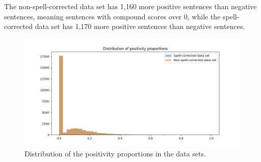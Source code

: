 The non-spell-corrected data set has 1,160 more positive sentences than negative sentences, meaning sentences with compound scores over 0, while the spell-corrected data set has 1,170 more positive sentences than negative sentences.


\begin{figure}[H]
    \centering
    \includegraphics[width=1\textwidth]{resources/positivity_distributions.png}
    \caption{Distribution of the positivity proportions in the data sets.}
    \label{fig:positivity_distribution}
\end{figure}